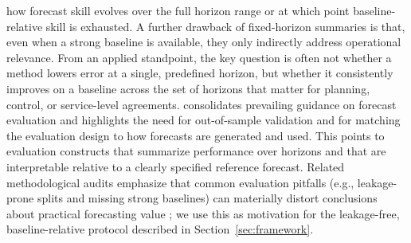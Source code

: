 \documentclass[pdflatex,sn-mathphys]{sn-jnl}
\begin{document}
how forecast skill evolves over the full horizon range or at which point
baseline-relative skill is exhausted.
A further drawback of fixed-horizon summaries is that, even when a
strong baseline is available, they only indirectly address operational
relevance. From an applied standpoint, the key question is often not
whether a method lowers error at a single, predefined horizon, but
whether it consistently improves on a baseline across the set of
horizons that matter for planning, control, or service-level agreements.
\citet{hyndman2018} consolidates prevailing guidance on forecast
evaluation and highlights the need for out-of-sample validation and for
matching the evaluation design to how forecasts are generated and used.
This points to evaluation constructs that summarize performance over
horizons and that are interpretable relative to a clearly specified
reference forecast.
Related methodological audits emphasize that common evaluation pitfalls (e.g., leakage-prone splits and missing strong baselines) can materially distort conclusions about practical forecasting value \citep{hewamalage2023dmkd}; we use this as motivation for the leakage-free, baseline-relative protocol described in Section~\ref{sec:framework}.
\end{document}
